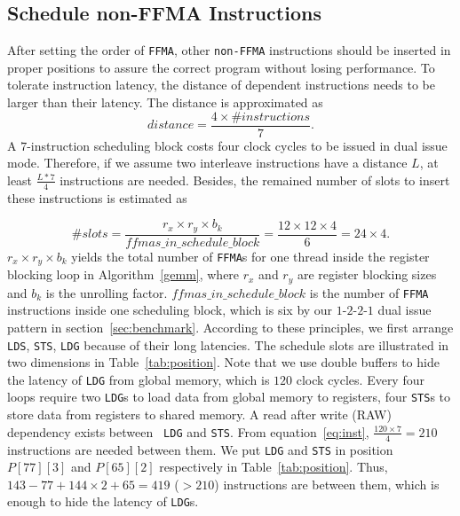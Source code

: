 \subsection{Schedule non-FFMA Instructions}
After setting the order of {\tt FFMA}, other {\tt non-FFMA} instructions should be inserted in proper positions to
assure the correct program without losing performance. To tolerate instruction latency, the
distance of dependent instructions needs to be larger than their latency. The distance is approximated as
\begin{equation}
\label{eq:inst}
distance = \frac{4\times\#instructions}{7}.
\end{equation}
A $7$-instruction scheduling block costs four clock cycles to be issued in dual issue mode.
Therefore, if we assume two interleave instructions have a distance $L$, at least $\frac{L*7}{4}$ instructions are needed.
Besides, the remained number of slots
to insert these instructions is estimated as

\begin{displaymath}
\#slots = \frac{r_x\times r_y\times b_k}{ffmas\_in\_schedule\_block}=\frac{12\times 12\times 4}{6}=24\times 4.
\end{displaymath}
$r_x\times r_y\times b_k$ yields the total number of {\tt FFMA}s for one thread inside the register blocking loop in Algorithm~\ref{gemm}, where $r_x$ and $r_y$ are register blocking sizes and $b_k$ is the unrolling factor.
$ffmas\_in\_schedule\_block$ is the number of {\tt FFMA} instructions inside one scheduling block, which is six by our
$1$-$2$-$2$-$1$ dual issue pattern in section~\ref{sec:benchmark}.
According to these principles, we first arrange {\tt LDS}, {\tt STS}, {\tt LDG} because of their long latencies. The
schedule slots are illustrated in two dimensions in Table~\ref{tab:position}.
Note that we use double buffers to hide the latency of {\tt LDG} from global memory, which is $120$ clock cycles.
Every four loops require two {\tt LDG}s to load data from global memory to registers, four {\tt STS}s to store data from
registers to shared memory. A read after write (RAW) dependency exists between {\tt
LDG} and {\tt STS}.
From equation~\ref{eq:inst}, $\frac{120\times 7}{4} = 210$ instructions are needed between them.
We put {\tt LDG} and  {\tt STS} in position $P[77][3]$ and $P[65][2]$ respectively in Table~\ref{tab:position}.
Thus, $143-77 + 144\times 2 + 65=419$ ($>210$) instructions are between them, which is enough to hide the latency of {\tt LDG}s.


